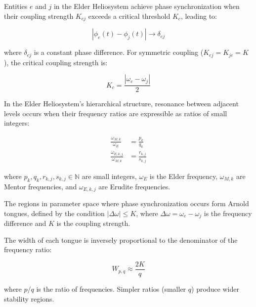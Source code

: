 \begin{theorem}
Entities $e$ and $j$ in the Elder Heliosystem achieve phase synchronization when their coupling strength $K_{ej}$ exceeds a critical threshold $K_c$, leading to:

\begin{equation}
|\phi_e(t) - \phi_j(t)| \to \delta_{ej}
\end{equation}

where $\delta_{ej}$ is a constant phase difference. For symmetric coupling ($K_{ej} = K_{je} = K$), the critical coupling strength is:

\begin{equation}
K_c = \frac{|\omega_e - \omega_j|}{2}
\end{equation}
\end{theorem}

\begin{theorem}
In the Elder Heliosystem's hierarchical structure, resonance between adjacent levels occurs when their frequency ratios are expressible as ratios of small integers:

\begin{align}
\frac{\omega_{M,k}}{\omega_E} &= \frac{p_k}{q_k} \\
\frac{\omega_{E,k,j}}{\omega_{M,k}} &= \frac{r_{k,j}}{s_{k,j}}
\end{align}

where $p_k, q_k, r_{k,j}, s_{k,j} \in \mathbb{N}$ are small integers, $\omega_E$ is the Elder frequency, $\omega_{M,k}$ are Mentor frequencies, and $\omega_{E,k,j}$ are Erudite frequencies.
\end{theorem}

\begin{theorem}
The regions in parameter space where phase synchronization occurs form Arnold tongues, defined by the condition $|\Delta\omega| \leq K$, where $\Delta\omega = \omega_e - \omega_j$ is the frequency difference and $K$ is the coupling strength. 

The width of each tongue is inversely proportional to the denominator of the frequency ratio:

\begin{equation}
W_{p,q} \approx \frac{2K}{q}
\end{equation}

where $p/q$ is the ratio of frequencies. Simpler ratios (smaller $q$) produce wider stability regions.
\end{theorem}

